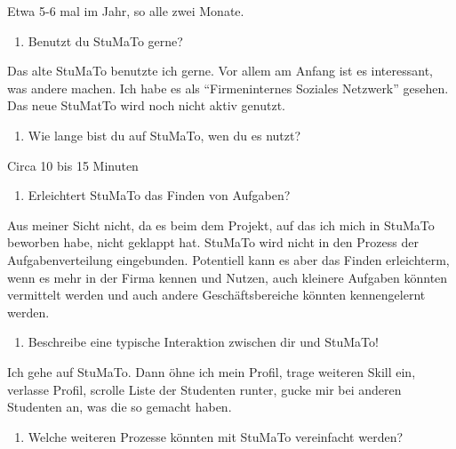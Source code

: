\documentclass[
  12pt,
  ngerman,
  a4paper,
]{article}
\providecommand{\tightlist}{%
  \setlength{\itemsep}{0pt}\setlength{\parskip}{0pt}}
\begin{document}
Etwa 5-6 mal im Jahr, so alle zwei Monate.

\begin{enumerate}
\def\labelenumi{\arabic{enumi}.}
\setcounter{enumi}{11}
\tightlist
\item
  Benutzt du StuMaTo gerne?
\end{enumerate}

Das alte StuMaTo benutzte ich gerne. Vor allem am Anfang ist es
interessant, was andere machen. Ich habe es als ``Firmeninternes
Soziales Netzwerk'' gesehen. Das neue StuMatTo wird noch nicht aktiv
genutzt.

\begin{enumerate}
\def\labelenumi{\arabic{enumi}.}
\setcounter{enumi}{12}
\tightlist
\item
  Wie lange bist du auf StuMaTo, wen du es nutzt?
\end{enumerate}

Circa 10 bis 15 Minuten

\begin{enumerate}
\def\labelenumi{\arabic{enumi}.}
\setcounter{enumi}{13}
\tightlist
\item
  Erleichtert StuMaTo das Finden von Aufgaben?
\end{enumerate}

Aus meiner Sicht nicht, da es beim dem Projekt, auf das ich mich in
StuMaTo beworben habe, nicht geklappt hat. StuMaTo wird nicht in den
Prozess der Aufgabenverteilung eingebunden. Potentiell kann es aber das
Finden erleichterm, wenn es mehr in der Firma kennen und Nutzen, auch
kleinere Aufgaben könnten vermittelt werden und auch andere
Geschäftsbereiche könnten kennengelernt werden.

\begin{enumerate}
\def\labelenumi{\arabic{enumi}.}
\setcounter{enumi}{14}
\tightlist
\item
  Beschreibe eine typische Interaktion zwischen dir und StuMaTo!
\end{enumerate}

Ich gehe auf StuMaTo. Dann öhne ich mein Profil, trage weiteren Skill
ein, verlasse Profil, scrolle Liste der Studenten runter, gucke mir bei
anderen Studenten an, was die so gemacht haben.

\begin{enumerate}
\def\labelenumi{\arabic{enumi}.}
\setcounter{enumi}{15}
\tightlist
\item
  Welche weiteren Prozesse könnten mit StuMaTo vereinfacht werden?
\end{enumerate}
\end{document}
